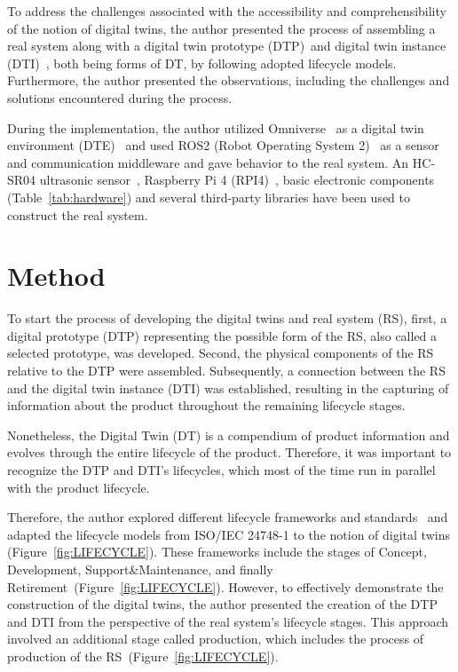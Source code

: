 \documentclass[conference]{IEEEtran}
\begin{document}
    To address the challenges associated with the accessibility and comprehensibility of the notion of digital twins, the author presented the
    process of assembling a real system along with a digital twin prototype (DTP)~\cite{Originsofdigitaltwinconcept}and digital twin instance (DTI)~\cite{Originsofdigitaltwinconcept}, both being forms of DT, 
    by following adopted lifecycle models. Furthermore, the author presented the observations, including the challenges and solutions encountered during the process.

    During the implementation, the author utilized Omniverse~\cite{Omniverse} as a digital twin environment (DTE)~\cite{Originsofdigitaltwinconcept} and used ROS2 (Robot Operating System 2)~\cite{ROS2}
    as a sensor and communication middleware and gave behavior to the real system. An HC-SR04 ultrasonic sensor~\cite{HCSR04}, Raspberry Pi 4 (RPI4)~\cite{RPI4}, 
    basic electronic components (Table~\ref{tab:hardware}) and several third-party libraries have been used to construct the real system. 

    \section{Method}\label{section:Method}
    To start the process of developing the digital twins and real system (RS), first, a digital prototype (DTP) 
    representing the possible form of the RS, also called a selected prototype, was developed. 
    Second, the physical components of the RS relative to the DTP were assembled. 
    Subsequently, a connection between the RS and the digital twin instance (DTI) was established, 
    resulting in the capturing of information about the product throughout the remaining lifecycle stages.

    Nonetheless, the Digital Twin (DT) is a compendium of product information and evolves through the entire lifecycle of the product. 
    Therefore, it was important to recognize the DTP and DTI's lifecycles, which most of the time run in parallel with the product lifecycle.

    Therefore, the author explored different lifecycle frameworks and standards~\cite{ISO/IEC/IEEE12207,ISO/IEC/IEEE15288,ISO/IEC/IEEE24748-1:2018} and adapted the lifecycle models 
    from ISO/IEC 24748-1 to the notion of digital twins (Figure~\ref{fig:LIFECYCLE}). 
    These frameworks include the stages of  Concept, Development, Support\&Maintenance, and finally Retirement~\cite{ISO/IEC/IEEE24748-1:2018}(Figure~\ref{fig:LIFECYCLE}). 
    However, to effectively demonstrate the construction of the digital twins, the author presented the creation of the DTP and DTI from the perspective of the real system's lifecycle stages. 
    This approach involved an additional stage called production, which includes the process of production of the RS~\cite{ISO/IEC/IEEE24748-1:2018}(Figure~\ref{fig:LIFECYCLE}).
\end{document}
